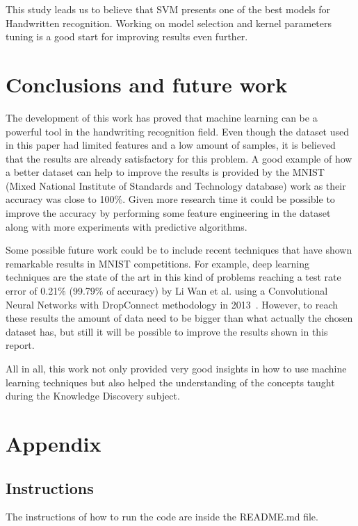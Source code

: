 \documentclass[letterpaper,10pt]{article}
\theoremstyle{mytheor}
\begin{document}
This study leads us to believe that SVM presents one of the best models for Handwritten recognition. Working on model selection and kernel parameters tuning is a good start for improving results even further.

\section{Conclusions and future work}

The development of this work has proved that machine learning can be a powerful tool in the handwriting recognition field. Even though the dataset used in this paper had limited features and a low amount of samples, it is believed that the results are already satisfactory for this problem. A good example of how a better dataset can help to improve the results is provided by the MNIST (Mixed National Institute of Standards and Technology database) work as their accuracy was close to 100\%. Given more research time it could be possible to improve the accuracy by performing some feature engineering in the dataset along with more experiments with predictive algorithms. 

Some possible future work could be to include recent techniques that have shown remarkable results in MNIST competitions. For example, deep learning techniques are the state of the art in this kind of problems reaching a test rate error of 0.21\% (99.79\% of accuracy) by Li Wan et al. using a Convolutional Neural Networks with DropConnect methodology in 2013~\cite{wan2013regularization}. However, to reach these results the amount of data need to be bigger than what actually the chosen dataset has, but still it will be possible to improve the results shown in this report.

All in all, this work not only provided very good insights in how to use machine learning techniques but also helped the understanding of the concepts taught during the Knowledge Discovery subject.

\nocite{nbsklearn}




\section{Appendix}

\subsection{Instructions}
The instructions of how to run the code are inside the README.md file.
\end{document}
